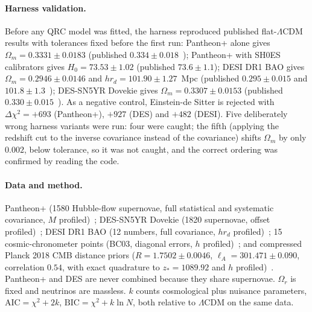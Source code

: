\documentclass[11pt]{article}
\theoremstyle{definition}
\theoremstyle{remark}
\begin{document}
\paragraph{Harness validation.} Before any QRC model was fitted, the harness reproduced
published flat-$\Lambda$CDM results with tolerances fixed before the first run:
Pantheon+ alone gives $\Omega_m=0.3331\pm0.0183$ (published $0.334\pm0.018$~\cite{brout2022});
Pantheon+ with SH0ES calibrators gives $H_0=73.53\pm1.02$ (published $73.6\pm1.1$);
DESI DR1 BAO gives $\Omega_m=0.2946\pm0.0146$ and $hr_d=101.90\pm1.27$~Mpc (published
$0.295\pm0.015$ and $101.8\pm1.3$~\cite{desi2024}); DES-SN5YR Dovekie gives
$\Omega_m=0.3307\pm0.0153$ (published $0.330\pm0.015$~\cite{popovic2025}). As a negative
control, Einstein-de Sitter is rejected with $\Delta\chi^2=+693$ (Pantheon+), $+927$
(DES) and $+482$ (DESI). Five deliberately wrong harness variants were run: four were
caught; the fifth (applying the redshift cut to the inverse covariance instead of the
covariance) shifts $\Omega_m$ by only $0.002$, below tolerance, so it was not caught, and
the correct ordering was confirmed by reading the code.

\paragraph{Data and method.} Pantheon+ (1580 Hubble-flow supernovae, full statistical
and systematic covariance, $M$ profiled)~\cite{brout2022}; DES-SN5YR Dovekie (1820
supernovae, offset profiled)~\cite{popovic2025}; DESI DR1 BAO (12 numbers, full
covariance, $hr_d$ profiled)~\cite{desi2024}; 15 cosmic-chronometer points
(BC03, diagonal errors, $h$ profiled)~\cite{moresco2012,moresco2015,moresco2016};
and compressed Planck 2018 CMB distance priors ($R=1.7502\pm0.0046$, $\ell_A=301.471\pm0.090$,
correlation $0.54$, with exact quadrature to $z_*=1089.92$ and $h$ profiled)~\cite{chen2019}.
Pantheon+ and DES are never combined because they share supernovae. $\Omega_r$ is
fixed and neutrinos are massless. $k$ counts cosmological plus nuisance parameters,
$\mathrm{AIC}=\chi^2+2k$, $\mathrm{BIC}=\chi^2+k\ln N$, both relative to $\Lambda$CDM on
the same data.
\end{document}

